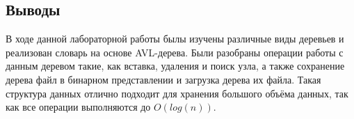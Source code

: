 \documentclass[12pt]{article}
\begin{document}
\subsection*{Выводы}

В ходе данной лабораторной работы былы изучены различные виды деревьев и реализован словарь на основе AVL-дерева. Были разобраны операции работы с данным деревом такие, как вставка, удаления и поиск узла, а также сохранение дерева файл в бинарном представлении и загрузка дерева их файла. Такая структура данных отлично подходит для хранения большого объёма данных, так как все операции выполняются до $O(log(n))$.
\end{document}
